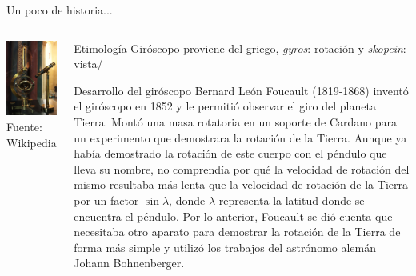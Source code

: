 \begin{frame}{Un poco de historia...}
\begin{columns}
\begin{column}{0.3\textwidth}
      \includegraphics[width=0.7\linewidth]{05.instrumentos.giroscopicos.imagenes/05.01.movimientos/foucault_giroscopo_wiki.jpg}\\
      {\tiny Fuente: Wikipedia}
    \end{column}
    \begin{column}{0.7\textwidth}{\small

  \begin{block}{Etimolog\'ia}
    Gir\'oscopo proviene del griego,
	{\it gyros}: rotaci\'on y {\it skopein}: vista/
  \end{block}

      \begin{exampleblock}{Desarrollo del gir\'oscopo}
        Bernard Le\'on Foucault (1819-1868) invent\'o el gir\'oscopo
        en 1852 y le permiti\'o observar el giro del planeta Tierra.
        Mont\'o una masa rotatoria en un soporte de Cardano para un
        experimento que demostrara la rotaci\'on de la Tierra.  Aunque
        ya hab\'ia demostrado la rotaci\'on de este cuerpo con el
        p\'endulo que lleva su nombre, no comprend\'ia por qu\'e la
        velocidad de rotaci\'on del mismo resultaba m\'as lenta que la
        velocidad de rotaci\'on de la Tierra por un factor
        $\sin{\lambda}$, donde $\lambda$ representa la latitud donde
        se encuentra el p\'endulo.  Por lo anterior, Foucault se di\'o
        cuenta que necesitaba otro aparato para demostrar la
        rotaci\'on de la Tierra de forma m\'as simple y utiliz\'o los
        trabajos del astr\'onomo alem\'an Johann Bohnenberger.
      \end{exampleblock}
	}
    \end{column}
  \end{columns}
  
\end{frame}

